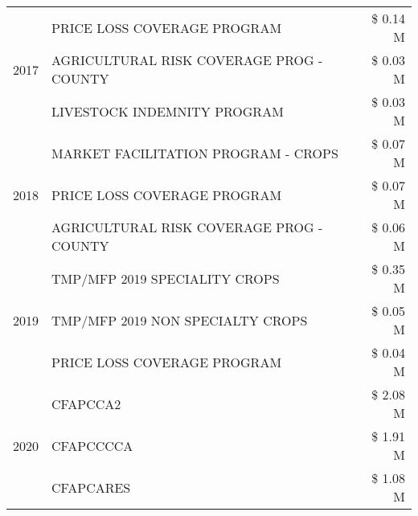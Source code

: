 \begin{tabular}{llr}
\cline{1-3}
\multirow[t]{3}{*}{2017} & PRICE LOSS COVERAGE PROGRAM & \$ 0.14 M \\
 & AGRICULTURAL RISK COVERAGE PROG - COUNTY & \$ 0.03 M \\
 & LIVESTOCK INDEMNITY PROGRAM & \$ 0.03 M \\
\cline{1-3}
\multirow[t]{3}{*}{2018} & MARKET FACILITATION PROGRAM - CROPS & \$ 0.07 M \\
 & PRICE LOSS COVERAGE PROGRAM & \$ 0.07 M \\
 & AGRICULTURAL RISK COVERAGE PROG - COUNTY & \$ 0.06 M \\
\cline{1-3}
\multirow[t]{3}{*}{2019} & TMP/MFP 2019 SPECIALITY CROPS & \$ 0.35 M \\
 & TMP/MFP 2019 NON SPECIALTY CROPS & \$ 0.05 M \\
 & PRICE LOSS COVERAGE PROGRAM & \$ 0.04 M \\
\cline{1-3}
\multirow[t]{3}{*}{2020} & CFAPCCA2 & \$ 2.08 M \\
 & CFAPCCCCA & \$ 1.91 M \\
 & CFAPCARES & \$ 1.08 M \\
\cline{1-3}
\bottomrule
\end{tabular}
